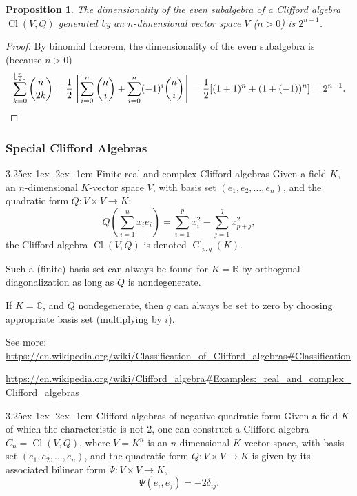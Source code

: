 \documentclass[12pt, letterpaper]{article}
\makeatletter
\newcommand{\re}{\mathbb{R}}
\newcommand{\co}{\mathbb{C}}
\newcommand{\Cl}{\operatorname{Cl}}
\DeclarePairedDelimiter\floor{\lfloor}{\rfloor}
\newcommand{\red}[1]{{\color{red} #1}}
\newtheorem{prop}{Proposition}[section]
\renewcommand\paragraph{\@startsection{paragraph}{4}{\z@}%
	{3.25ex \@plus1ex \@minus.2ex}%
	{-1em}%
	{\normalfont\normalsize\bfseries}}
\theoremstyle{definition}
\theoremstyle{remark}
\theoremstyle{definition}
\theoremstyle{plain}
\numberwithin{equation}{section}
\makeatother
\begin{document}
	\begin{prop}\label{propOrderEvenSubalgebra}
		The dimensionality of the even subalgebra of a Clifford algebra $\Cl(V,Q)$ generated by an $n$-dimensional vector space
		$V$ ($n>0$)	is $2^{n-1}$.
	\end{prop}
	\begin{proof}
		By binomial theorem, the dimensionality of the even subalgebra is (because $n>0$)
		\[
		\sum_{k=0}^{\floor{\frac{n}{2}}}\binom{n}{2k}=\frac{1}{2}\left[
		\sum_{i=0}^{n}\binom{n}{i}+\sum_{i=0}^{n}(-1)^i\binom{n}{i}\right]
		=\frac{1}{2}[(1+1)^{n}+(1+(-1))^{n}]=2^{n-1}.
		\]
	\end{proof}

	\subsubsection{Special Clifford Algebras}
	\paragraph{Finite real and complex Clifford algebras}
	Given a field $K$, an $n$-dimensional $K$-vector space $V$,
	with basis set $(e_1,e_2,\dots,e_n)$,
	and the quadratic form $Q\colon V\times V\to K$:
	\[Q\left(\sum_{i=1}^{n}x_ie_i\right)=\sum_{i=1}^{p}x_i^2-\sum_{j=1}^{q}x_{p+j}^2, \]
	the Clifford algebra $\Cl(V,Q)$ is denoted $\Cl_{p,q}(K)$.
	
	\red{Such a (finite) basis set can always be found for $K=\re$ by orthogonal diagonalization as long as $Q$ is nondegenerate.}
	
	If $K=\co$, and $Q$ nondegenerate, then $q$ can always be set to zero by choosing appropriate basis set
	(multiplying by $i$).
	
	See more:
	\url{https://en.wikipedia.org/wiki/Classification_of_Clifford_algebras#Classification}
	
	\url{https://en.wikipedia.org/wiki/Clifford_algebra#Examples:_real_and_complex_Clifford_algebras}
	
	\paragraph{Clifford algebras of negative quadratic form}
	Given a field $K$ of which the characteristic is not 2,
	one can construct a Clifford algebra $C_n=\Cl(V,Q)$,
	where $V=K^n$ is an $n$-dimensional $K$-vector space,
	with basis set $(e_1,e_2,\dots,e_n)$,
	and the quadratic form $Q\colon V\times V\to K$
	is given by its associated bilinear form $\Psi\colon V\times V\to K$,
	\[\Psi(e_i,e_j)=-2\delta_{ij}.\]
	
\end{document}

